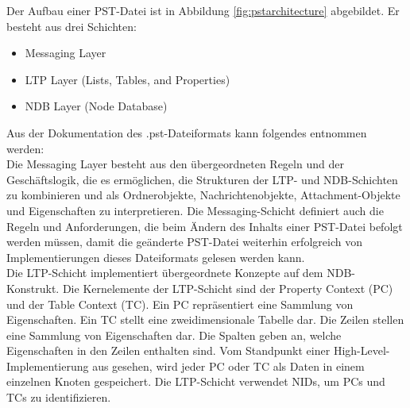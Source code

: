 Der Aufbau einer PST-Datei ist in Abbildung \ref{fig:pstarchitecture} abgebildet. Er besteht aus drei Schichten:

\begin{itemize}
    \item Messaging Layer
    \item LTP Layer (Lists, Tables, and Properties)
    \item NDB Layer (Node Database)

\end{itemize}

Aus der Dokumentation des .pst-Dateiformats kann folgendes entnommen werden: \\
Die Messaging Layer besteht aus den übergeordneten Regeln und der Geschäftslogik, die es ermöglichen, die Strukturen der LTP- und NDB-Schichten zu kombinieren und als Ordnerobjekte, Nachrichtenobjekte, Attachment-Objekte und Eigenschaften zu interpretieren. Die Messaging-Schicht definiert auch die Regeln und Anforderungen, die beim Ändern des Inhalts einer PST-Datei befolgt werden müssen, damit die geänderte PST-Datei weiterhin erfolgreich von Implementierungen dieses Dateiformats gelesen werden kann. \\


Die LTP-Schicht implementiert übergeordnete Konzepte auf dem NDB-Konstrukt. Die Kernelemente der LTP-Schicht sind der Property Context (PC) und der Table Context (TC). Ein PC repräsentiert eine Sammlung von Eigenschaften. Ein TC stellt eine zweidimensionale Tabelle dar. Die Zeilen stellen eine Sammlung von Eigenschaften dar. Die Spalten geben an, welche Eigenschaften in den Zeilen enthalten sind.
Vom Standpunkt einer High-Level-Implementierung aus gesehen, wird jeder PC oder TC als Daten in einem einzelnen Knoten gespeichert. Die LTP-Schicht verwendet NIDs, um PCs und TCs zu identifizieren.\\


